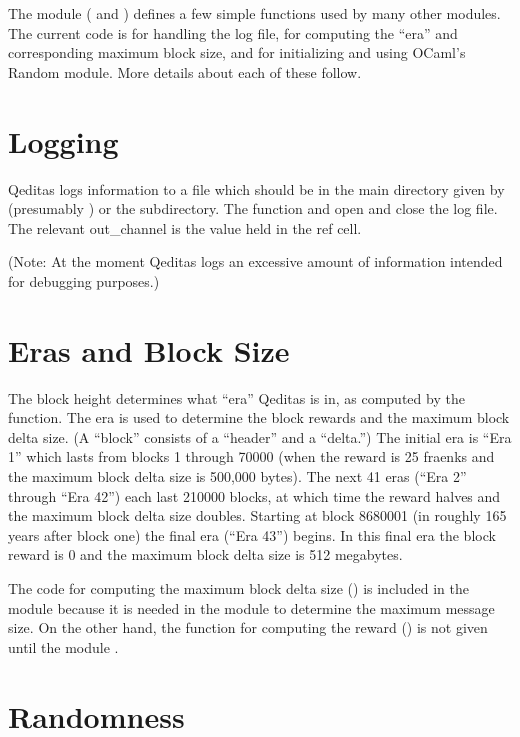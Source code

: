 The module  ( and ) defines a few simple functions used by many other modules.
The current code is for handling the log file, for computing the ``era'' and corresponding maximum block size,
and for initializing and using OCaml's Random module. More details about each of these follow.

\section{Logging}

Qeditas logs information to a {} file which should be in the main directory given by {} (presumably {}) or the {} subdirectory.
The function {} and {} open and close the log file.
The relevant out\_channel is the value held in the {} ref cell.

(Note: At the moment Qeditas logs an excessive amount of information intended for debugging purposes.)

\section{Eras and Block Size}

The block height determines what ``era'' Qeditas is in, as computed by the {} function.
The era is used to determine the block rewards and the maximum block delta size. (A ``block'' consists of a ``header'' and a ``delta.'')
The initial era is ``Era 1'' which lasts from blocks 1 through 70000 (when the reward is 25 fraenks
and the maximum block delta size is 500,000 bytes).
The next 41 eras (``Era 2'' through ``Era 42'') each last 210000 blocks, at which time the reward halves
and the maximum block delta size doubles.
Starting at block 8680001 (in roughly 165 years after block one) the final era (``Era 43'') begins.
In this final era the block reward is 0 and the maximum block delta size is 512 megabytes.

The code for computing the maximum block delta size ({}) is included in the  module
because it is needed in the  module to determine the maximum message size.
On the other hand, the function for computing the reward ({}) is not given until the module .

\section{Randomness}


